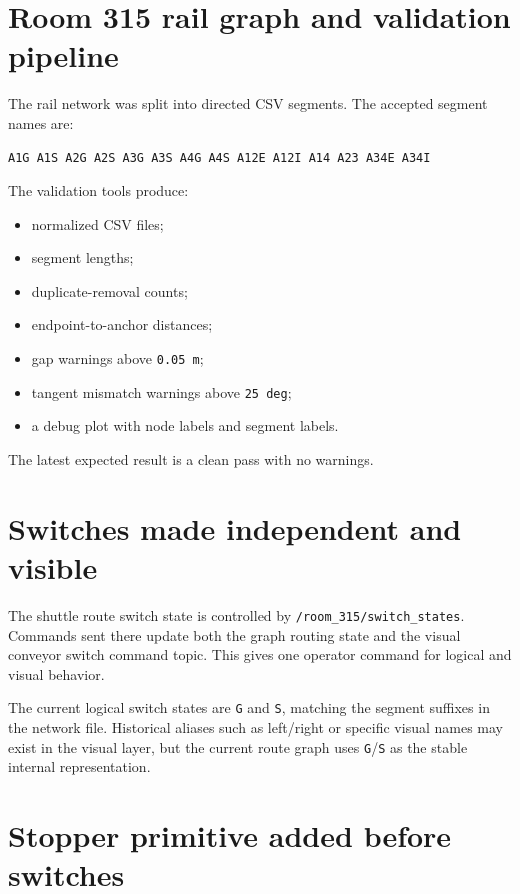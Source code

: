\documentclass[12pt,a4paper]{report}
\begin{document}
\section{Room 315 rail graph and validation pipeline}

The rail network was split into directed CSV segments. The accepted segment
names are:

\begin{lstlisting}[style=terminalcode]
A1G A1S A2G A2S A3G A3S A4G A4S A12E A12I A14 A23 A34E A34I
\end{lstlisting}

The validation tools produce:

\begin{itemize}
\item normalized CSV files;
\item segment lengths;
\item duplicate-removal counts;
\item endpoint-to-anchor distances;
\item gap warnings above \texttt{0.05 m};
\item tangent mismatch warnings above \texttt{25 deg};
\item a debug plot with node labels and segment labels.
\end{itemize}

The latest expected result is a clean pass with no warnings.

\section{Switches made independent and visible}

The shuttle route switch state is controlled by
\texttt{/room\_315/switch\_states}. Commands sent there update both the graph
routing state and the visual conveyor switch command topic. This gives one
operator command for logical and visual behavior.

The current logical switch states are \texttt{G} and \texttt{S}, matching the
segment suffixes in the network file. Historical aliases such as left/right or
specific visual names may exist in the visual layer, but the current route graph
uses \texttt{G}/\texttt{S} as the stable internal representation.

\section{Stopper primitive added before switches}
\end{document}
